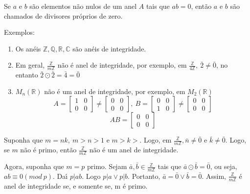 Se $a$ e $b$ s{\~a}o elementos n{\~a}o nulos de um anel $A$ tais que $ab=0$, ent{\~a}o $a$ e $b$ s{\~a}o chamados de divisores pr{\'o}prios de zero.

Exemplos:
\begin{enumerate}
\item Os an{\'e}is $\mathbb{Z},\mathbb{Q},\mathbb{R},\mathbb{C}$ s{\~a}o an{\'e}is de integridade.
\item Em geral, $\displaystyle\frac{\mathbb{Z}}{m\mathbb{Z}}$ n{\~a}o {\'e} anel de integridade, por exemplo, em $\displaystyle\frac{\mathbb{Z}}{4\mathbb{Z}},\ \bar{2}\neq\bar{0}$, no entanto $\bar{2}\odot\bar{2}=\bar{4}=\bar{0}$
\item $M_{n}(\mathbb{R})$ n{\~a}o {\'e} um anel de integridade, por exemplo, em $M_{2}(\mathbb{R})$\\
\[A=\left[\begin{array}{cc}
1 & 0\\
0 & 0
\end{array}\right]\neq\left[\begin{array}{cc}
0 & 0\\
0 & 0
\end{array}\right],\ B=\left[\begin{array}{cc}
0 & 0\\
1 & 0
\end{array}\right]\neq\left[\begin{array}{cc}
0 & 0\\
0 & 0
\end{array}\right]\]
\[AB=\left[\begin{array}{cc}
0 & 0\\
0 & 0
\end{array}\right]\]

\end{enumerate}

Suponha que $m=nk,\ m>n>1$ e $m>k>$. Logo, em $\displaystyle\frac{\mathbb{Z}}{m\mathbb{Z}}, \bar{n}\neq\bar{0}$ e $\bar{k}\neq\bar{0}$. Logo, se $m$ n{\~a}o {\'e} primo, ent{\~a}o $\displaystyle\frac{\mathbb{Z}}{m\mathbb{Z}}$ n{\~a}o {\'e} um anel de integridade.

Agora, suponha que $m=p$ primo. Sejam $\bar{a},\bar{b}\in\displaystyle\frac{\mathbb{Z}}{m\mathbb{Z}}$ tais que $\bar{a}\odot\bar{b}=\bar{0}$, ou seja, $ab\equiv 0(mod\ p)$. Da{\'\i} $p|ab$. Logo $p|a\vee p|b$. Portanto, $\bar{a}=\bar{0}\vee \bar{b}=\bar{0}$. Assim, $\displaystyle\frac{\mathbb{Z}}{m\mathbb{Z}}$ {\'e} anel de integridade se, e somente se, m {\'e} primo.


